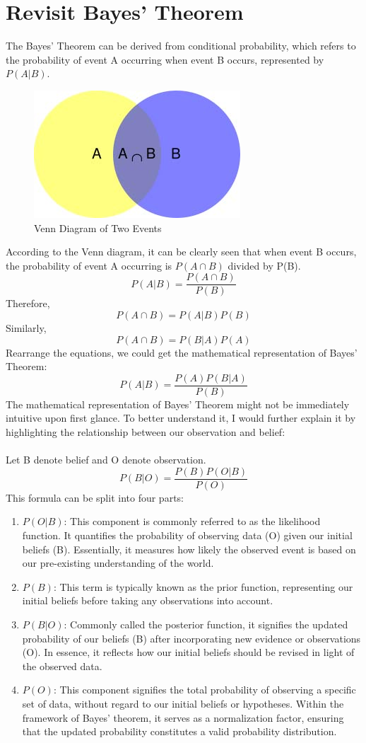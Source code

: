 \documentclass{article}
\begin{document}
\section{Revisit Bayes' Theorem}
The Bayes' Theorem can be derived from conditional probability, which refers to the probability of event A occurring when event B occurs, represented by $P(A|B)$.
\begin{figure}[!htbp]
    \centering
    \includegraphics{Picture1.jpg}
    \caption{Venn Diagram of Two Events}
    \label{fig:enter-label}
\end{figure}
\FloatBarrier
According to the Venn diagram, it can be clearly seen that when event B occurs, the probability of event A occurring is $P(A \cap B)$ divided by P(B).
\[P(A|B)=\frac{P(A \cap B)}{P(B)}\]
Therefore,
\[P(A \cap B)=P(A|B)P(B)\]
Similarly,
\[P(A \cap B)=P(B|A)P(A)\]
Rearrange the equations, we could get the mathematical representation of Bayes' Theorem:
\[P(A|B)=\frac{P(A)P(B|A)}{P(B)}\]
The mathematical representation of Bayes' Theorem might not be immediately intuitive upon first glance. To better understand it, I would further explain it by highlighting the relationship between our observation and belief:\\\\
Let B denote belief and O denote observation.
\[P(B|O)=\frac{P(B)P(O|B)}{P(O)}\]
This formula can be split into four parts:
\begin{enumerate}
    \item $P(O|B)$: This component is commonly referred to as the likelihood function. It quantifies the probability of observing data (O) given our initial beliefs (B). Essentially, it measures how likely the observed event is based on our pre-existing understanding of the world.
    \item $P(B)$: This term is typically known as the prior function, representing our initial beliefs before taking any observations into account.
    \item $P(B|O)$: Commonly called the posterior function, it signifies the updated probability of our beliefs (B) after incorporating new evidence or observations (O). In essence, it reflects how our initial beliefs should be revised in light of the observed data.
    \item $P(O)$: This component signifies the total probability of observing a specific set of data, without regard to our initial beliefs or hypotheses. Within the framework of Bayes' theorem, it serves as a normalization factor, ensuring that the updated probability constitutes a valid probability distribution.
\end{enumerate}
\end{document}
